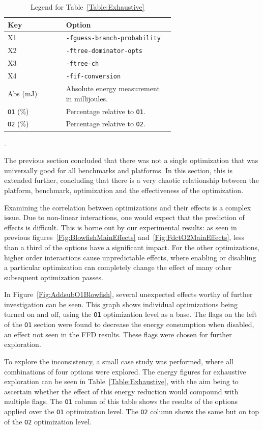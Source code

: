 \documentclass[twocolumn]{article}
\let\oldcaption\caption
\renewcommand{\caption}[1]{\oldcaption{\textup{#1}}}
\begin{document}
\begin{table}[thb]
	\centering
	\begin{tabular}{l p{0.65\linewidth}}
		\bfseries Key & \bfseries Option \\
		\hline
		X1 & \texttt{-fguess-branch-probability}  \\
		X2 & \texttt{-ftree-dominator-opts}  \\
		X3 & \texttt{-ftree-ch} \\
		X4 & \texttt{-fif-conversion} \\
		Abs (mJ) & Absolute energy measurement in millijoules. \\
		\texttt{O1} (\%) & Percentage relative to \texttt{O1}. \\
		\texttt{O2} (\%) & Percentage relative to \texttt{O2}. \\
	\end{tabular}
	\caption{Legend for Table~\ref{Table:Exhaustive}}.
	\label{Table:ExhaustiveLegend}
\end{table}


The previous section concluded that there was not a single optimization that was universally good for all benchmarks and platforms. In this section, this is extended further, concluding that there is a very chaotic relationship between the platform, benchmark, optimization and the effectiveness of the optimization.

Examining the correlation between optimizations and their effects is a complex issue. Due to non-linear interactions, one would expect that the prediction of effects is difficult. This is borne out by our experimental results: as seen in previous figures~\ref{Fig:BlowfishMainEffects} and~\ref{Fig:FdctO2MainEffects}, less than a third of the options have a significant impact. For the other optimizations, higher order interactions cause unpredictable effects, where enabling or disabling a particular optimization can completely change the effect of many other subsequent optimization passes.

In Figure~\ref{Fig:AddsubO1Blowfish}, several unexpected effects worthy of further investigation can be seen. This graph shows individual optimizations being turned on and off, using the \texttt{O1} optimization level as a base. The flags on the left of the \texttt{O1} section were found to decrease the energy consumption when disabled, an effect not seen in the FFD results. These flags were chosen for further exploration.

To explore the inconsistency, a small case study was performed, where all combinations of four options were explored. The energy figures for exhaustive exploration can be seen in Table~\ref{Table:Exhaustive}, with the aim being to ascertain whether the effect of this energy reduction would compound with multiple flags. The \texttt{O1} column of this table shows the results of the options applied over the \texttt{O1} optimization level. The \texttt{O2} column shows the same but on top of the \texttt{O2} optimization level.
\end{document}
